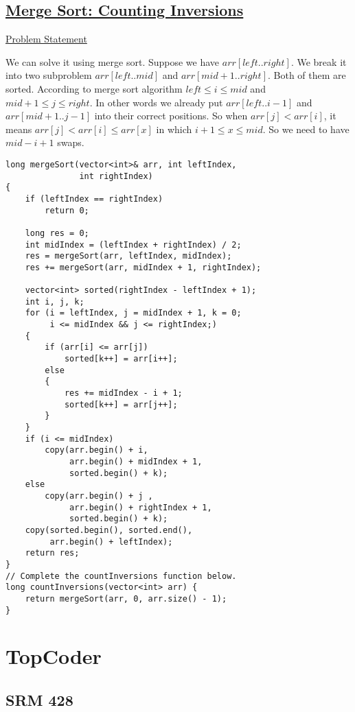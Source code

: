 \documentclass{book}
\begin{document}
	\section{\href{https://www.hackerrank.com/challenges/ctci-merge-sort/problem}{Merge Sort: Counting Inversions}}
	\href{https://www.hackerrank.com/challenges/ctci-merge-sort/problem?h_l=interview&playlist_slugs%5B%5D=interview-preparation-kit&playlist_slugs%5B%5D=sorting}{Problem Statement}
	\par We can solve it using merge sort. Suppose we have $arr[left..right]$. We break it into two subproblem $arr[left..mid]$ and $arr[mid + 1..right]$. Both of them are sorted. According to merge sort algorithm $left \le i \le mid$ and $mid + 1 \le j \le right$. In other words we already put $arr[left..i - 1]$ and $arr[mid + 1..j - 1]$ into their correct positions. So when $arr[j] < arr[i]$, it means $arr[j] < arr[i] \le arr[x]$ in which $i + 1 \le x \le mid$. So we need to have $mid - i + 1$ swaps.
	\begin{lstlisting}
long mergeSort(vector<int>& arr, int leftIndex, 
               int rightIndex)
{
    if (leftIndex == rightIndex)
        return 0;
        
    long res = 0;
    int midIndex = (leftIndex + rightIndex) / 2;
    res = mergeSort(arr, leftIndex, midIndex);
    res += mergeSort(arr, midIndex + 1, rightIndex);

    vector<int> sorted(rightIndex - leftIndex + 1);
    int i, j, k;
    for (i = leftIndex, j = midIndex + 1, k = 0; 
         i <= midIndex && j <= rightIndex;)
    {
        if (arr[i] <= arr[j])
            sorted[k++] = arr[i++];
        else  
        {            
            res += midIndex - i + 1;
            sorted[k++] = arr[j++];
        }
    }
    if (i <= midIndex)
        copy(arr.begin() + i, 
             arr.begin() + midIndex + 1, 
             sorted.begin() + k);
    else  
        copy(arr.begin() + j , 
             arr.begin() + rightIndex + 1,
             sorted.begin() + k);
    copy(sorted.begin(), sorted.end(), 
         arr.begin() + leftIndex);
    return res;
}
// Complete the countInversions function below.
long countInversions(vector<int> arr) {
    return mergeSort(arr, 0, arr.size() - 1);
}
	\end{lstlisting}
	\chapter{TopCoder}
	\section{SRM 428}
\end{document}
